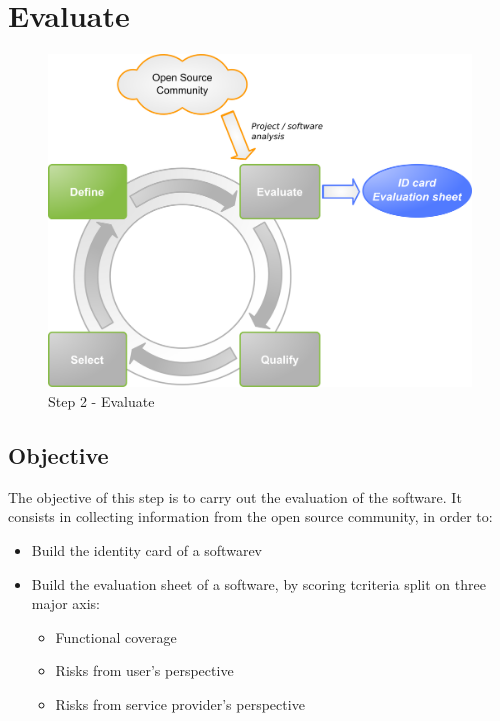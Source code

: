 %
\section{Evaluate}
\begin{figure}
\center
\includegraphics[width=13cm]{images/evaluer}
\caption{Step 2 - Evaluate}
\end{figure}


\subsection{Objective}
The objective of this step is to carry out the evaluation of the software. It consists in collecting information from the open source community, in order to:

\begin{itemize}
\item Build the identity card of a softwarev
\item Build the evaluation sheet of a software, by scoring tcriteria split on three major axis:
  \begin{itemize}
  \item Functional coverage
  \item Risks from user's perspective
  \item Risks from service provider's perspective
  \end{itemize}
\end{itemize}

